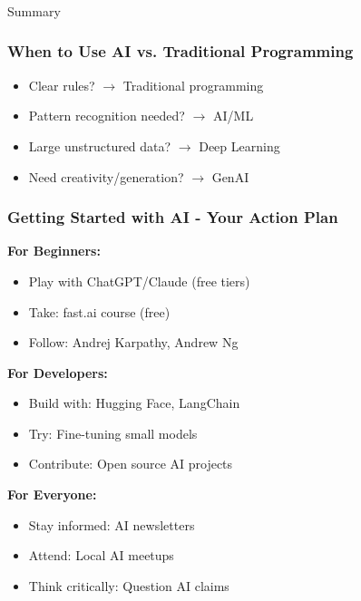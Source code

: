 \begin{frame}[fragile]\frametitle{}
\begin{center}
{\Large Summary}
\end{center}
\end{frame}

\begin{frame}[fragile]\frametitle{When to Use AI vs. Traditional Programming}
\begin{itemize}
\item Clear rules? $\rightarrow$ Traditional programming
\item Pattern recognition needed? $\rightarrow$ AI/ML
\item Large unstructured data? $\rightarrow$ Deep Learning
\item Need creativity/generation? $\rightarrow$ GenAI
\end{itemize}
\end{frame}


\begin{frame}[fragile]\frametitle{Getting Started with AI - Your Action Plan}

\textbf{For Beginners:}
\begin{itemize}
\item Play with ChatGPT/Claude (free tiers)
\item Take: fast.ai course (free)
\item Follow: Andrej Karpathy, Andrew Ng
\end{itemize}

\textbf{For Developers:}
\begin{itemize}
\item Build with: Hugging Face, LangChain
\item Try: Fine-tuning small models
\item Contribute: Open source AI projects
\end{itemize}

\textbf{For Everyone:}
\begin{itemize}
\item Stay informed: AI newsletters
\item Attend: Local AI meetups
\item Think critically: Question AI claims
\end{itemize}

\end{frame}

